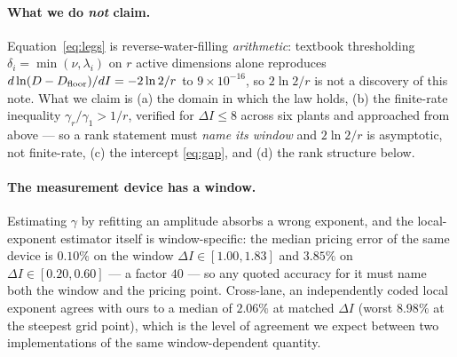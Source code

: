 \paragraph{What we do \emph{not} claim.} Equation~\eqref{eq:legs} is
reverse-water-filling \emph{arithmetic}: textbook thresholding
$\delta_i=\min(\nu,\lambda_i)$ on $r$ active dimensions alone reproduces
$d\ln(D-D_{\rm floor})/dI=-2\ln2/r$ to $9\times10^{-16}$, so $2\ln2/r$ is not a
discovery of this note. What we claim is (a) the domain in which the law holds,
(b) the finite-rate inequality $\gamma_r/\gamma_1>1/r$, verified for
$\Delta I\le8$ across six plants and approached from above --- so a rank statement
must \emph{name its window} and $2\ln2/r$ is asymptotic, not finite-rate, (c) the
intercept \eqref{eq:gap}, and (d) the rank structure below.

\paragraph{The measurement device has a window.} Estimating $\gamma$ by refitting
an amplitude absorbs a wrong exponent, and the local-exponent estimator itself is
window-specific: the median pricing error of the same device is $0.10\%$ on the
window $\Delta I\in[1.00,1.83]$ and $3.85\%$ on $\Delta I\in[0.20,0.60]$ --- a
factor $40$ --- so any quoted accuracy for it must name both the window and the
pricing point. Cross-lane, an independently coded local exponent agrees with ours
to a median of $2.06\%$ at matched $\Delta I$ (worst $8.98\%$ at the steepest grid
point), which is the level of agreement we expect between two implementations of
the same window-dependent quantity.

